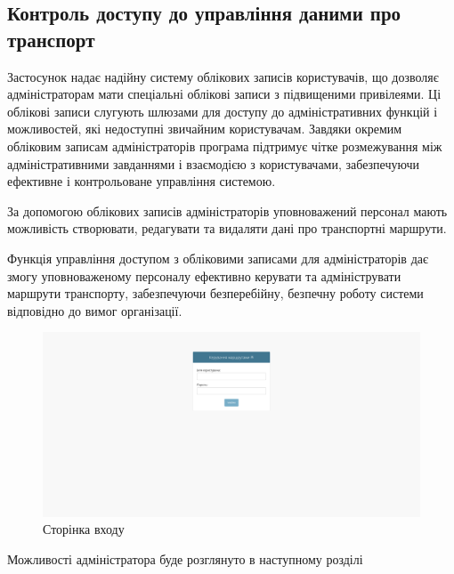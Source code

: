 \subsection{Контроль доступу до управління даними про транспорт}
\label{subsec:route-search-subsection}

Застосунок надає надійну систему облікових записів користувачів, що дозволяє адміністраторам мати спеціальні облікові записи з підвищеними привілеями. Ці облікові записи слугують шлюзами для доступу до адміністративних функцій і можливостей, які недоступні звичайним користувачам. Завдяки окремим обліковим записам адміністраторів програма підтримує чітке розмежування між адміністративними завданнями і взаємодією з користувачами, забезпечуючи ефективне і контрольоване управління системою.

За допомогою облікових записів адміністраторів уповноважений персонал мають можливість створювати, редагувати та видаляти дані про транспортні маршрути.

Функція управління доступом з обліковими записами для адміністраторів дає змогу уповноваженому персоналу ефективно керувати та адмініструвати маршрути транспорту, забезпечуючи безперебійну, безпечну роботу системи відповідно до вимог організації.

\begin{figure}[!h]
	\centering
	\includegraphics[scale=0.35]{content/chapters/4-results/assets/img/login_page.png}
	\caption{Сторінка входу}
	\label{fig:login_page}
\end{figure}

Можливості адміністратора буде розглянуто в наступному розділі